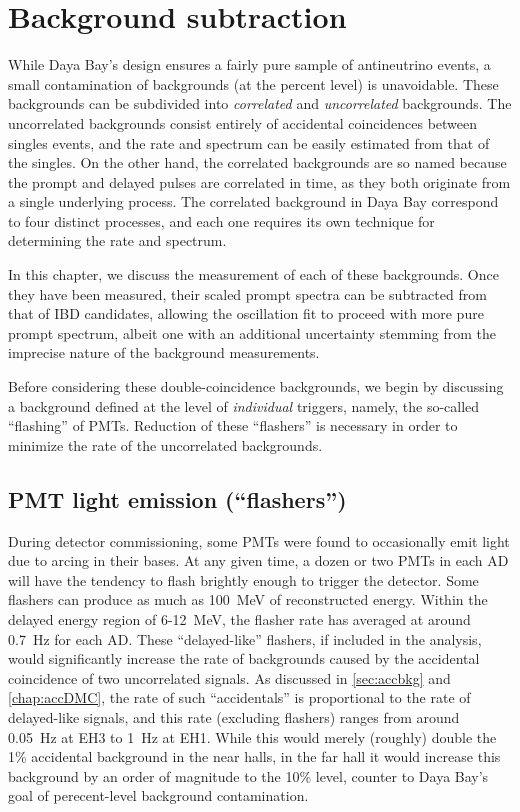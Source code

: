 \documentclass[../thesis.tex]{subfiles}
\begin{document}
\chapter{Background subtraction}
\label{chap:bkg}

While Daya Bay's design ensures a fairly pure sample of antineutrino events, a
small contamination of backgrounds (at the percent level) is unavoidable. These
backgrounds can be subdivided into \emph{correlated} and \emph{uncorrelated}
backgrounds. The uncorrelated backgrounds consist entirely of accidental
coincidences between singles events, and the rate and spectrum can be easily
estimated from that of the singles. On the other hand, the correlated
backgrounds are so named because the prompt and delayed pulses are correlated in
time, as they both originate from a single underlying process. The correlated
background in Daya Bay correspond to four distinct processes, and each one
requires its own technique for determining the rate and spectrum.

In this chapter, we discuss the measurement of each of these backgrounds. Once
they have been measured, their scaled prompt spectra can be subtracted from that
of IBD candidates, allowing the oscillation fit to proceed with more pure prompt
spectrum, albeit one with an additional uncertainty stemming from the imprecise
nature of the background measurements.

Before considering these double-coincidence backgrounds, we begin by discussing
a background defined at the level of \emph{individual} triggers, namely, the
so-called ``flashing'' of PMTs. Reduction of these ``flashers'' is necessary in
order to minimize the rate of the uncorrelated backgrounds.

\section{PMT light emission (``flashers'')}
\label{sec:bkgFlashers}

During detector commissioning, some PMTs were found to occasionally emit light
due to arcing in their bases. At any given time, a dozen or two PMTs in each AD
will have the tendency to flash brightly enough to trigger the detector. Some
flashers can produce as much as 100~MeV of reconstructed energy. Within the
delayed energy region of 6-12~MeV, the flasher rate has averaged at around
0.7~Hz for each AD. These ``delayed-like'' flashers, if included in the
analysis, would significantly increase the rate of backgrounds caused by the
accidental coincidence of two uncorrelated signals. As discussed in
\autoref{sec:accbkg} and \autoref{chap:accDMC}, the rate of such ``accidentals''
is proportional to the rate of delayed-like signals, and this rate (excluding
flashers) ranges from around 0.05~Hz at EH3 to 1~Hz at EH1. While this would
merely (roughly) double the 1\% accidental background in the near halls, in the
far hall it would increase this background by an order of magnitude to the 10\%
level, counter to Daya Bay's goal of perecent-level background contamination.
\end{document}
